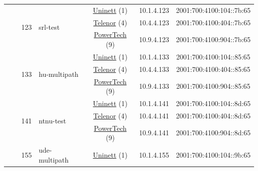 \begin{small}
\begin{center}
\begin{longtable}{|c|c|c|c|c|c|c|c|}
  &  & \multirow{3}{*}{\tiny{123}} & \multicolumn{1}{|l|}{\multirow{3}{*}{\tiny{srl-test}}} & \multicolumn{2}{|c|}{\tiny{\href{https://www.uninett.no}{Uninett} (1)}} & \tiny{10.1.4.123} & \tiny{2001:700:4100:104::7b:65} \\* \cline{5-5}\cline{6-6}\cline{7-7}\cline{8-8}
  &  &  &  & \multicolumn{2}{|c|}{\tiny{\href{https://www.telenor.no}{Telenor} (4)}} & \tiny{10.4.4.123} & \tiny{2001:700:4100:404::7b:65} \\* \cline{5-5}\cline{6-6}\cline{7-7}\cline{8-8}
  &  &  &  & \multicolumn{2}{|c|}{\tiny{\href{http://www.powertech.no}{PowerTech} (9)}} & \tiny{10.9.4.123} & \tiny{2001:700:4100:904::7b:65} \\* \cline{3-3}\cline{4-4}\cline{5-5}\cline{6-6}\cline{7-7}\cline{8-8}
  &  & \multirow{3}{*}{\tiny{133}} & \multicolumn{1}{|l|}{\multirow{3}{*}{\tiny{hu-multipath}}} & \multicolumn{2}{|c|}{\tiny{\href{https://www.uninett.no}{Uninett} (1)}} & \tiny{10.1.4.133} & \tiny{2001:700:4100:104::85:65} \\* \cline{5-5}\cline{6-6}\cline{7-7}\cline{8-8}
  &  &  &  & \multicolumn{2}{|c|}{\tiny{\href{https://www.telenor.no}{Telenor} (4)}} & \tiny{10.4.4.133} & \tiny{2001:700:4100:404::85:65} \\* \cline{5-5}\cline{6-6}\cline{7-7}\cline{8-8}
  &  &  &  & \multicolumn{2}{|c|}{\tiny{\href{http://www.powertech.no}{PowerTech} (9)}} & \tiny{10.9.4.133} & \tiny{2001:700:4100:904::85:65} \\* \cline{3-3}\cline{4-4}\cline{5-5}\cline{6-6}\cline{7-7}\cline{8-8}
  &  & \multirow{3}{*}{\tiny{141}} & \multicolumn{1}{|l|}{\multirow{3}{*}{\tiny{ntnu-test}}} & \multicolumn{2}{|c|}{\tiny{\href{https://www.uninett.no}{Uninett} (1)}} & \tiny{10.1.4.141} & \tiny{2001:700:4100:104::8d:65} \\* \cline{5-5}\cline{6-6}\cline{7-7}\cline{8-8}
  &  &  &  & \multicolumn{2}{|c|}{\tiny{\href{https://www.telenor.no}{Telenor} (4)}} & \tiny{10.4.4.141} & \tiny{2001:700:4100:404::8d:65} \\* \cline{5-5}\cline{6-6}\cline{7-7}\cline{8-8}
  &  &  &  & \multicolumn{2}{|c|}{\tiny{\href{http://www.powertech.no}{PowerTech} (9)}} & \tiny{10.9.4.141} & \tiny{2001:700:4100:904::8d:65} \\* \cline{3-3}\cline{4-4}\cline{5-5}\cline{6-6}\cline{7-7}\cline{8-8}
  &  & \multirow{3}{*}{\tiny{155}} & \multicolumn{1}{|l|}{\multirow{3}{*}{\tiny{ude-multipath}}} & \multicolumn{2}{|c|}{\tiny{\href{https://www.uninett.no}{Uninett} (1)}} & \tiny{10.1.4.155} & \tiny{2001:700:4100:104::9b:65} \\* \cline{5-5}\cline{6-6}\cline{7-7}\cline{8-8}

\end{longtable}
\end{center}
\end{small}
